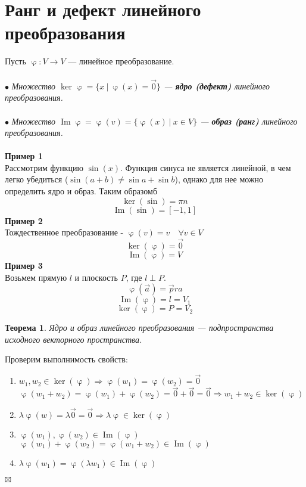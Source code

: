 \documentclass[a4paper, 12pt]{article}
\newtheorem*{theorem}{Теорема}
\newenvironment{Proof}
{\par\noindent{$\blacklozenge$}}
{\hfill$\scriptstyle\boxtimes$}
\renewcommand{\Im}{\operatorname{Im}}
\renewcommand{\ker}{\operatorname{ker}}
\renewcommand{\varphi}{\upvarphi}
\begin{document}
\section{Ранг и дефект линейного преобразования}
Пусть $\varphi:V\rightarrow V$ --- линейное преобразование.\\\\
$\bullet$ \textit{Множество $\ker \varphi = \{x\ |\ \varphi(x)=\vec 0\}$ --- \textbf{ядро (дефект)} линейного преобразования.}\\\\
$\bullet$ \textit{Множество $\Im \varphi = \varphi(v)=\{\varphi(x)\ |\ x \in V\}$ --- \textbf{образ (ранг)} линейного преобразования.}\\\\
\textbf{Пример 1}\\
Рассмотрим функцию $\sin(x)$. Функция синуса не является линейной, в чем легко убедиться ($\sin(a+b) \neq \sin a + \sin b$), однако для нее можно определить ядро и образ. Таким образомб
$$\ker (\sin) = {\pi n}$$
$$\Im (\sin) = [-1,1]$$
\textbf{Пример 2}\\
Тождественное преобразование - $\varphi(v)=v \quad \forall v \in V$
$$\ker( \varphi) = \vec 0$$
$$\Im (\varphi) = V$$
\textbf{Пример 3}\\
Возьмем прямую $l$ и плоскость $P$, где $l \perp P$.
$$\varphi(\vec a)=\vec pr a$$
$$\Im (\varphi) = l = V_1$$
$$\ker (\varphi) = P = V_2$$
\begin{theorem}
    Ядро и образ линейного преобразования --- подпространства исходного векторного пространства.
\end{theorem}
\begin{Proof}
	Проверим выполнимость свойств:
   \begin{enumerate}
       \item $w_1,w_2 \in \ker (\varphi) \Rightarrow \varphi(w_1)=\varphi(w_2)=\vec 0$
       $\varphi(w_1+w_2)=\varphi(w_1)+\varphi(w_2)=\vec 0+ \vec 0=\vec 0 \Rightarrow w_1+w_2 \in \ker (\varphi)$
       \item $\lambda \varphi(w)=\lambda \vec 0=\vec 0 \Rightarrow \lambda \varphi \in \ker (\varphi)$
       \item $\varphi(w_1),\varphi(w_2) \in \Im (\varphi)$\\
       $\varphi(w_1)+\varphi(w_2)=\varphi(w_1+w_2) \in \Im (\varphi)$
       \item $\lambda \varphi(w_1)=\varphi(\lambda w_1) \in \Im (\varphi)$
   \end{enumerate}
\end{Proof}\\
\end{document}
